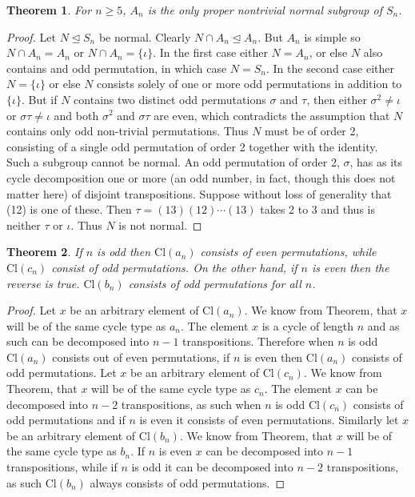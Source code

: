 \documentclass[a4paper,10pt]{article}
\newtheorem{theorem}{Theorem}
\begin{document}
\begin{theorem}
For $n \geq 5$, $A_n$ is the only proper nontrivial normal subgroup of $S_n$. 
\end{theorem}
\begin{proof}
Let $N \unlhd S_n$ be normal. Clearly $N\cap A_n \unlhd A_n$. But $A_n$ is simple so $N\cap A_n = A_n$ or $N\cap A_n = \{\iota\}$. In the first case either $N=A_n$, or else $N$ also contains and odd permutation, in which case $N=S_n$. In the second case either $N=\{\iota\}$ or else $N$ consists solely of one or more odd permutations in addition to $\{\iota\}$. But if $N$ contains two distinct odd permutations $\sigma$ and $\tau$, then either $\sigma^2 \neq \iota$ or $\sigma \tau \neq \iota$ and both $\sigma^2$ and $\sigma \tau$ are even, which contradicts the assumption that $N$ contains only odd non-trivial permutations. Thus $N$ must be of order 2, consisting of a single odd permutation of order 2 together with the identity. \\

Such a subgroup cannot be normal. An odd permutation of order 2, $\sigma$, has as its cycle decomposition one or more (an odd number, in fact, though this does not matter here) of disjoint transpositions. Suppose without loss of generality that (12) is one of these. Then $\tau = (13)(12)\cdots(13)$ takes 2 to 3 and thus is neither $\tau$ or $\iota$. Thus $N$ is not normal.
\end{proof}

\begin{theorem}
If $n$ is odd then $\textrm{Cl}(a_n)$ consists of even permutations, while $\textrm{Cl}(c_n)$ consist of odd permutations. On the other hand, if $n$ is even then the reverse is true. $\textrm{Cl}(b_n)$ consists of odd permutations for all $n$.     
\end{theorem}
\begin{proof}
Let $x$ be an arbitrary element of $\textrm{Cl}(a_n)$. We know from Theorem, that $x$ will be of the same cycle type as $a_n$. The element $x$ is a cycle of length $n$ and as such can be decomposed into $n-1$ transpositions. Therefore when $n$ is odd $\textrm{Cl}(a_n)$ consists out of even permutations, if $n$ is even then $\textrm{Cl}(a_n)$ consists of odd permutations. Let $x$ be an arbitrary element of $\textrm{Cl}(c_n)$. We know from Theorem, that $x$ will be of the same cycle type as $c_n$. The element $x$ can be decomposed into $n-2$ transpositions, as such when $n$ is odd $\textrm{Cl}(c_n)$ consists of odd permutations and if $n$ is even it consists of even permutations. Similarly let $x$ be an arbitrary element of $\textrm{Cl}(b_n)$. We know from Theorem, that $x$ will be of the same cycle type as $b_n$. If $n$ is even $x$ can be decomposed into $n-1$ transpositions, while if $n$ is odd it can be decomposed into $n-2$ transpositions, as such $\textrm{Cl}(b_n)$ always consists of odd permutations.     
\end{proof}
\end{document}
